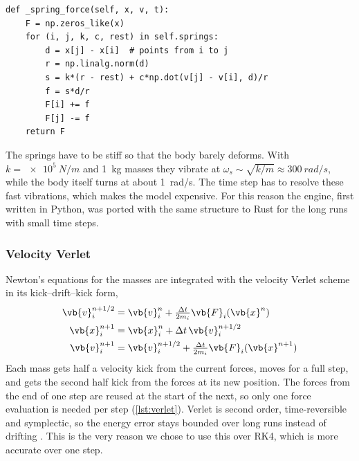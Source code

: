 \medskip\noindent\begin{minipage}{\linewidth}
\begin{verbatim}
def _spring_force(self, x, v, t):
    F = np.zeros_like(x)
    for (i, j, k, c, rest) in self.springs:
        d = x[j] - x[i]  # points from i to j
        r = np.linalg.norm(d)
        s = k*(r - rest) + c*np.dot(v[j] - v[i], d)/r
        f = s*d/r
        F[i] += f
        F[j] -= f
    return F
\end{verbatim}
\label{lst:spring}
\end{minipage}\par\medskip

The springs have to be stiff so that the body barely deforms.
With $k=\SI{e5}{N/m}$ and \SI{1}{kg} masses they vibrate at $\omega_s\sim\sqrt{k/m}\approx\SI{300}{rad/s}$, while the body itself turns at about \SI{1}{rad/s}.
The time step has to resolve these fast vibrations, which makes the model expensive.
For this reason the engine, first written in Python, was ported with the same structure to Rust for the long runs with small time steps.

\subsubsection{Velocity Verlet}
\label{sec:verlet}
Newton's equations for the masses are integrated with the velocity Verlet scheme in its kick--drift--kick form,
\begin{equation}
\begin{aligned}
    \vb{v}_i^{n+1/2} &= \vb{v}_i^{n} + \tfrac{\Delta t}{2m_i}\vb{F}_i(\vb{x}^{n})\\
    \vb{x}_i^{n+1}   &= \vb{x}_i^{n} + \Delta t\,\vb{v}_i^{n+1/2}\\
    \vb{v}_i^{n+1}   &= \vb{v}_i^{n+1/2} + \tfrac{\Delta t}{2m_i}\vb{F}_i(\vb{x}^{n+1})
\end{aligned}
\label{eq:verlet}
\end{equation}
Each mass gets half a velocity kick from the current forces, moves for a full step, and gets the second half kick from the forces at its new position.
The forces from the end of one step are reused at the start of the next, so only one force evaluation is needed per step (\cref{lst:verlet}).
Verlet is second order, time-reversible and symplectic, so the energy error stays bounded over long runs instead of drifting \cite{verlet1967,hairer2006}.
This is the very reason we chose to use this over RK4, which is more accurate over one step.

